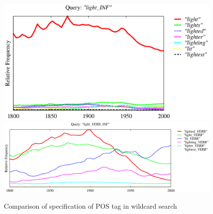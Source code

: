 \documentclass[11pt,a4paper]{article}
\begin{document}
\begin{figure}
\includegraphics[width=.48\textwidth]{graphs/light_INF}
\includegraphics[width=.48\textwidth]{graphs/light_INF_VERB}
\caption{\label{fig:light} Comparison of specification of POS tag in wildcard search}
\end{figure}
\end{document}
